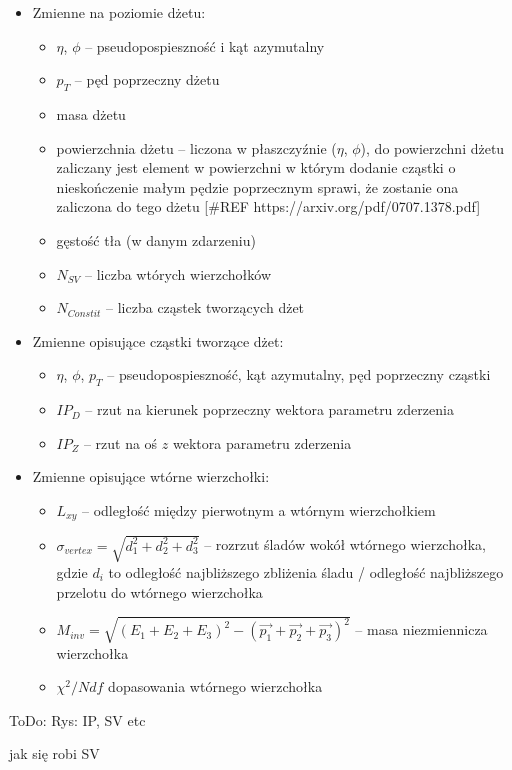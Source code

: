\begin{itemize}
	\item Zmienne na poziomie dżetu:
	\begin{itemize}	
		\item $\eta$, $\phi$ -- pseudopospieszność  i kąt azymutalny
		\item $p_T$ -- pęd poprzeczny dżetu
		\item masa dżetu
		\item powierzchnia dżetu -- liczona w płaszczyźnie ($\eta$, $\phi$),   do powierzchni dżetu zaliczany jest element w powierzchni w którym dodanie cząstki o nieskończenie małym pędzie poprzecznym sprawi, że zostanie ona zaliczona do tego dżetu  [\#REF https://arxiv.org/pdf/0707.1378.pdf]
		\item gęstość tła (w danym zdarzeniu)
		\item $N_{SV}$ -- liczba wtórych wierzchołków
		\item $N_{Constit}$ -- liczba cząstek tworzących dżet
	\end{itemize}
	
	
	\item Zmienne opisujące cząstki tworzące dżet:
	\begin{itemize}	
		\item $\eta$, $\phi$, $p_T$ -- pseudopospieszność, kąt azymutalny, pęd poprzeczny cząstki
		\item $IP_D$ -- rzut na kierunek poprzeczny wektora parametru zderzenia
		\item $IP_Z$ -- rzut na oś $z$ wektora parametru zderzenia
	\end{itemize}	
	
	
	\item Zmienne opisujące wtórne wierzchołki:
	\begin{itemize}	
		\item $L_{xy}$ -- odległość między pierwotnym a wtórnym wierzchołkiem 
		\item $\sigma_{vertex} = \sqrt{d_1^2 + d_2^2 + d_3^2}$ -- rozrzut śladów  wokół wtórnego wierzchołka, gdzie $d_i$ to odległość najbliższego zbliżenia śladu / odległość najbliższego przelotu do wtórnego wierzchołka  %
		\item $M_{inv} = \sqrt{(E_1 + E_2 + E_3)^2 - (\vec{p_1} + \vec{p_2} + \vec{p_3})^2}$ -- masa niezmiennicza wierzchołka
		\item $\chi^2/Ndf$  dopasowania wtórnego wierzchołka
	\end{itemize}
\end{itemize}


ToDo: Rys: IP, SV etc

jak się robi SV
